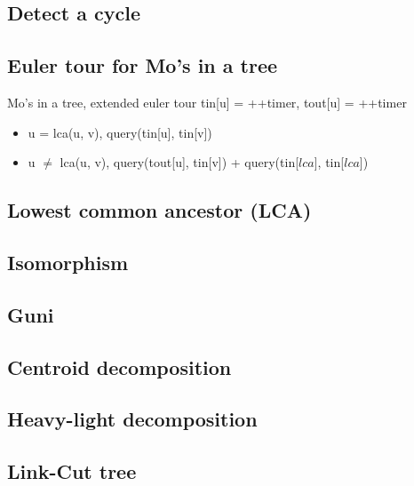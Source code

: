 \subsection{Detect a cycle}

\subsection{Euler tour for Mo's in a tree}
\vspace{-5pt}
Mo's in a tree, extended euler tour \small{tin[u] = ++timer, tout[u] = ++timer} 
\vspace{-5pt}
\begin{itemize}[noitemsep]
  \item u = lca(u, v), query(tin[u], tin[v]) 
  \item u $\neq$ lca(u, v), query(tout[u], tin[v]) + query(tin[$lca$], tin[$lca$])
\end{itemize}
\vspace{-10pt}

\subsection{Lowest common ancestor (LCA)}

\subsection{Isomorphism}

\subsection{Guni}

\subsection{Centroid decomposition}

\subsection{Heavy-light decomposition}

\subsection{Link-Cut tree}
